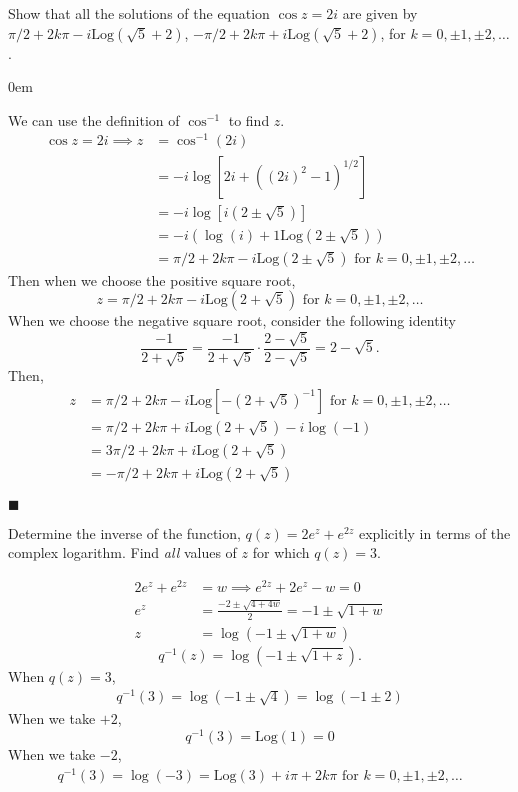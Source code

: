 \documentclass[12pt]{article}
\author{Warren Atkison}
\date{\today}
\renewcommand{\qed}{\hfill$\blacksquare$}
\renewenvironment{proof}{\vspace{1em}\begin{addmargin}[2em]{0em}\begin{newproof}}{\end{newproof}\end{addmargin}\qed}
\newenvironment{exercise}[2][Exercise]{\begin{trivlist}
\item[\hskip \labelsep {\bfseries #1} \hskip \labelsep {\bfseries #2.}]}{\end{trivlist}}
\begin{document}
\fancyhf{}
\fancyhead[R]{\today}
\fancyfoot[R]{\thepage}

\begin{exercise}{10}
	Show that all the solutions of the equation $\cos z = 2i$ are given by $\pi/2 + 2k\pi - i\text{Log}(\sqrt{5} + 2)$, $-\pi/2 + 2k\pi + i\text{Log}(\sqrt{5}+2)$, for $k = 0,\pm1,\pm2,\ldots$.	
\end{exercise}	
\begin{proof} We can use the definition of $\cos^{-1}$ to find $z$.
	\begin{align*}
		\cos z = 2i \implies z &= \cos^{-1}(2i) \\
				       &= -i\log[2i + ((2i)^2 - 1)^{1/2}] \\
				       &= -i\log[i(2 \pm \sqrt{5})] \\
				       &= -i(\log(i) +1\text{Log}(2 \pm \sqrt{5})) \\
				       &= \pi/2 + 2k\pi -i\text{Log}(2 \pm \sqrt{5}) \text{ for } k = 0,\pm1,\pm2,\ldots
	\end{align*}
	Then when we choose the positive square root,
	\[
		z = \pi/2 + 2k\pi -i\text{Log}(2 + \sqrt{5}) \text{ for } k = 0,\pm1,\pm2,\ldots
	\]
	When we choose the negative square root, consider the following identity
	\[
		\frac{-1}{2 + \sqrt{5}} = \frac{-1}{2 + \sqrt{5}}\cdot\frac{2 - \sqrt{5}}{2 - \sqrt{5}} = 2 - \sqrt{5}.
	\]
	Then,
	\begin{align*}
		z &= \pi/2 + 2k\pi -i\text{Log}[-(2 + \sqrt{5})^{-1}] \text{ for } k = 0,\pm1,\pm2,\ldots \\
		  &= \pi/2 + 2k\pi + i\text{Log}(2 + \sqrt{5}) - i\log(-1) \\
		  &= 3\pi/2 + 2k\pi + i\text{Log}(2 + \sqrt{5}) \\
		  &= -\pi/2 + 2k\pi + i\text{Log}(2 + \sqrt{5})
	\end{align*}
\end{proof}
\begin{exercise}{19}
	Determine the inverse of the function, $q(z) = 2e^z + e^{2z}$
	explicitly in terms of the complex logarithm. Find \textit{all} values of $z$ for which $q(z) = 3$.
\end{exercise}	
\begin{align*}
	2e^z + e^{2z} &= w \implies e^{2z} + 2e^{z} - w = 0 \\
	e^{z} &= \frac{-2 \pm\sqrt{4 + 4w}}{2} = -1 \pm \sqrt{1 + w} \\
	z &= \log\left(-1 \pm \sqrt{1 + w}\right)
\end{align*}
\[
	q^{-1}(z) = \log\left(-1 \pm \sqrt{1 + z}\right).
\]
When $q(z) = 3$,
\begin{align*}
	q^{-1}(3) = \log(-1 \pm \sqrt{4}) = \log(-1 \pm 2)
\end{align*}
When we take $+2$,
\[
	q^{-1}(3) = \text{Log}(1) = 0
\]
When we take $-2$,
\begin{align*}
	q^{-1}(3) = \log(-3) = \text{Log}(3) + i\pi + 2k\pi \text{ for } k = 0,\pm1,\pm2,\ldots
\end{align*}
\end{document}
